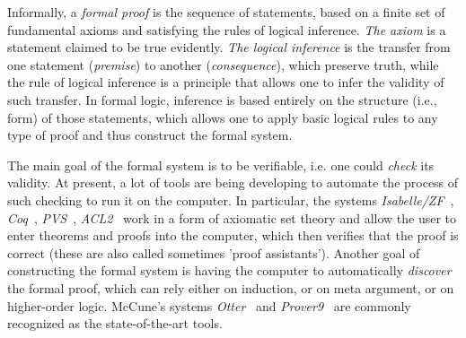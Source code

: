 \documentclass[article]{aaltoseries}
\begin{document}

Informally, a \textit{formal proof} is the sequence of statements, based on a finite set of fundamental axioms and satisfying the rules of logical inference. \textit{The axiom} is a statement claimed to be true evidently. \textit{The logical inference} is the transfer from one statement (\textit{premise}) to another (\textit{consequence}), which preserve truth, while the rule of logical inference is a principle that allows one to infer the validity of such transfer.
In formal logic, inference is based entirely on the structure (i.e., form) of those statements, which allows one to apply basic logical rules to any type of proof and thus construct the formal system.

The main goal of the formal system is to be verifiable, i.e. one could \textit{check} its validity. At present, a lot of tools are being developing to automate the process of such checking to run it on the computer. In particular, the systems \textit{Isabelle/ZF}~\cite{tool_Isabelle}, \textit{Coq}~\cite{tool_Coq}, \textit{PVS}~\cite{tool_Pvs}, \textit{ACL2}~\cite{tool_Acl} work in a form of axiomatic set theory and allow the user to enter theorems and proofs into the computer, which then verifies that the proof is correct (these are also called sometimes 'proof assistants').
Another goal of constructing the formal system is having the computer to automatically \textit{discover} the formal proof, which can rely either on induction, or on meta argument, or on higher-order logic. McCune’s systems \textit{Otter}~\cite{tool_Otter} and \textit{Prover9}~\cite{tool_Prover9} are commonly recognized as the state-of-the-art tools.
\end{document}
